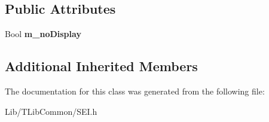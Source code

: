 \subsection*{Public Attributes}
\begin{DoxyCompactItemize}
\item 
\mbox{\label{class_s_e_i_no_display_aa75ddf8c18d6fc2f7ec8950766ca7594}} 
Bool {\bfseries m\+\_\+no\+Display}
\end{DoxyCompactItemize}
\subsection*{Additional Inherited Members}


The documentation for this class was generated from the following file\+:\begin{DoxyCompactItemize}
\item 
Lib/\+T\+Lib\+Common/S\+E\+I.\+h\end{DoxyCompactItemize}
